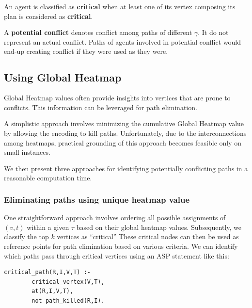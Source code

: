 \begin{definition}
    An agent is classified as \textbf{critical} when at least one of its vertex composing its plan is considered as \textbf{critical}.
\end{definition}

\begin{definition}
    A \textbf{potential conflict} denotes conflict among paths of different \(\gamma\). It do not represent an actual conflict. Paths of agents involved in potential conflict would end-up creating conflict if they were used as they were.
\end{definition}



\subsection{Using Global Heatmap}

Global Heatmap values often provide insights into vertices that are prone to conflicts. This information can be leveraged for path elimination. 

A simplistic approach involves minimizing the cumulative Global Heatmap value by allowing the encoding to kill paths. Unfortunately, due to the interconnections among heatmaps, practical grounding of this approach becomes feasible only on small instances.

We then present three approaches for identifying potentially conflicting paths in a reasonable computation time.

\subsubsection{Eliminating paths using unique heatmap value}

One straightforward approach involves ordering all possible assignments of \((v, t)\) within a given \(\tau\) based on their global heatmap values. Subsequently, we classify the top \(k\) vertices as ``critical'' These critical nodes can then be used as reference points for path elimination based on various criteria. We can identify which paths pass through critical vertices using an ASP statement like this:

\begin{minipage}[H]{\linewidth}
\begin{lstlisting}[style=mystyle]
    critical_path(R,I,V,T) :- 
        critical_vertex(V,T), 
        at(R,I,V,T), 
        not path_killed(R,I).
\end{lstlisting}
\end{minipage}



